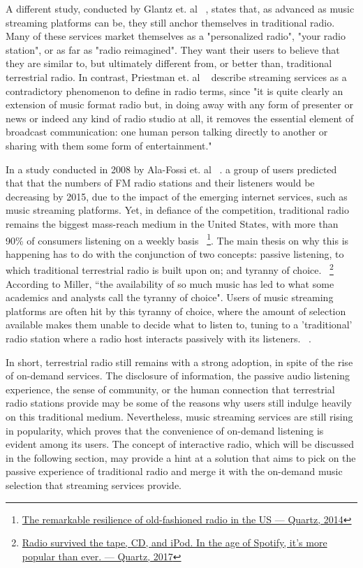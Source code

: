 A different study, conducted by Glantz et. al ~\cite{Glantz2016}, states that, as advanced as music streaming platforms can be, they still anchor themselves in traditional radio. Many of these services market themselves as a "personalized radio", "your radio station", or as far as "radio reimagined". They want their users to believe that they are similar to, but ultimately different from, or better than, traditional terrestrial radio. In contrast, Priestman et. al ~\cite{Priestman2005} describe streaming services as a contradictory phenomenon to define in radio terms, since "it is quite clearly an extension of music format radio but, in doing away with any form of presenter or news or indeed any kind of radio studio at all, it removes the essential element of broadcast communication: one human person talking directly to another or sharing with them some form of entertainment."

In a study conducted in 2008 by Ala-Fossi et. al ~\cite{Ala-Fossi2008}. a group of users predicted that that the numbers of FM radio stations and their listeners would be decreasing by 2015, due to the impact of the emerging internet services, such as music streaming platforms. Yet, in defiance of the competition, traditional radio remains the biggest mass-reach medium in the United States, with more than 90\% of consumers listening on a weekly basis ~\footnote{\href{https://qz.com/195349/the-remarkable-resilience-of-old-fashioned-radio-in-the-us/}{The remarkable resilience of old-fashioned radio in the US — Quartz, 2014}}. The main thesis on why this is happening has to do with the conjunction of two concepts: passive listening, to which traditional terrestrial radio is built upon on; and tyranny of choice. ~\footnote{\href{https://qz.com/1094963/radio-survived-the-tape-cd-and-ipod-in-the-age-of-spotify-its-more-popular-than-ever/}{Radio survived the tape, CD, and iPod. In the age of Spotify, it’s more popular than ever. — Quartz, 2017}} According to Miller, “the availability of so much music has led to what some academics and analysts call the tyranny of choice". Users of music streaming platforms are often hit by this tyranny of choice, where the amount of selection available makes them unable to decide what to listen to, tuning to a 'traditional' radio station where a radio host interacts passively with its listeners. ~\cite{Pedersen2014}.

In short, terrestrial radio still remains with a strong adoption, in spite of the rise of on-demand services. The disclosure of information, the passive audio listening experience, the sense of community, or the human connection that terrestrial radio stations provide may be some of the reasons why users still indulge heavily on this traditional medium. Nevertheless, music streaming services are still rising in popularity, which proves that the convenience of on-demand listening is evident among its users. The concept of interactive radio, which will be discussed in the following section, may provide a hint at a solution that aims to pick on the passive experience of traditional radio and merge it with the on-demand music selection that streaming services provide.

